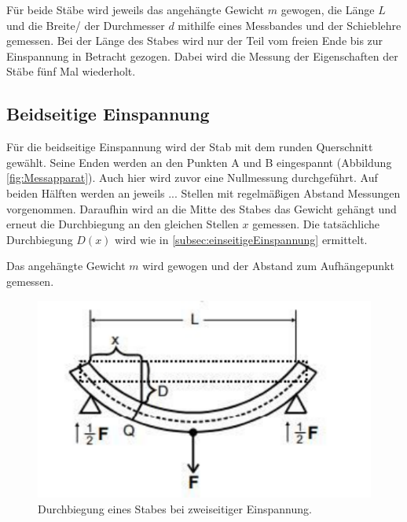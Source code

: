 Für beide Stäbe wird jeweils das angehängte Gewicht $m$ gewogen, die Länge $L$ und die Breite/ der Durchmesser $d$ mithilfe eines Messbandes und der Schieblehre gemessen.
Bei der Länge des Stabes wird nur der Teil vom freien Ende bis zur Einspannung in Betracht gezogen.
Dabei wird die Messung der Eigenschaften der Stäbe fünf Mal wiederholt.

\subsection{Beidseitige Einspannung}
Für die beidseitige Einspannung wird der Stab mit dem runden Querschnitt gewählt.
Seine Enden werden an den Punkten A und B eingespannt (Abbildung \ref{fig:Messapparat}).
Auch hier wird zuvor eine Nullmessung durchgeführt.
Auf beiden Hälften werden an jeweils ... Stellen mit regelmäßigen Abstand Messungen vorgenommen.
Daraufhin wird an die Mitte des Stabes das Gewicht gehängt und erneut die Durchbiegung an den gleichen Stellen $x$ gemessen.
Die tatsächliche Durchbiegung $D(x)$ wird wie in \ref{subsec:einseitigeEinspannung} ermittelt.

Das angehängte Gewicht $m$ wird gewogen und der Abstand zum Aufhängepunkt gemessen.

\begin{figure}
    \centering
    \includegraphics[width=\textwidth]{zweiseitig.pdf}
    \caption{Durchbiegung eines Stabes bei zweiseitiger Einspannung. \cite{anleitung}}
\end{figure}